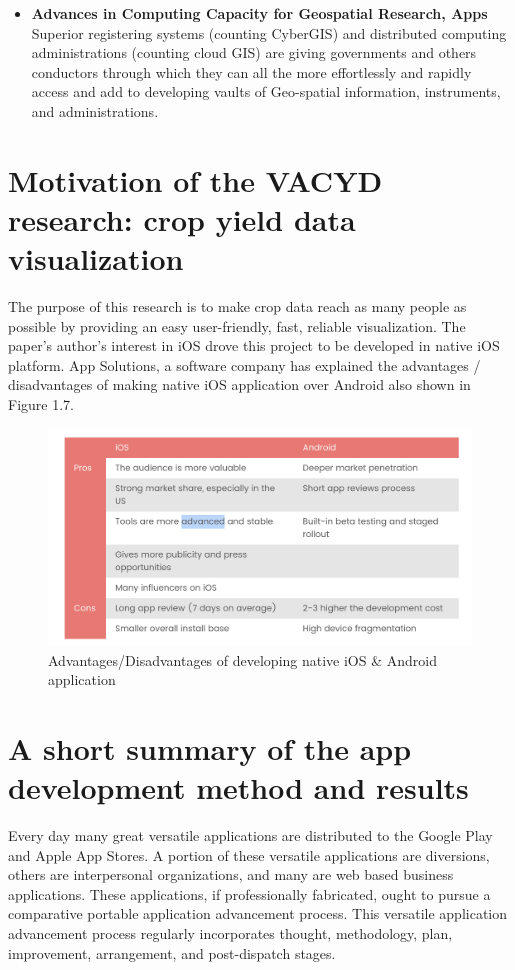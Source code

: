 \begin{itemize}
  \item  \textbf{Advances in Computing Capacity for Geospatial Research, Apps} \\
 Superior registering systems (counting CyberGIS) and distributed computing administrations (counting cloud GIS) are giving governments and others conductors through which they can all the more effortlessly and rapidly access and add to developing vaults of Geo-spatial information, instruments, and administrations.
  
\end{itemize}

\section{Motivation of the VACYD research: crop yield data visualization}

The purpose of this research is to make crop data reach as many people as possible by providing an easy user-friendly, fast, reliable visualization. The paper's author's interest in \gls{iOS} drove this project to be developed in native \gls{iOS} platform. App Solutions, a software company has explained the advantages / disadvantages of making native \gls{iOS} application over Android also shown in Figure 1.7\cite{theAPPsolutions}.

  \begin{figure}[H]
            \centering
            \includegraphics[width=0.8\linewidth]{figures/ch1/iosVSandroid.png}
            \caption{\label{fig:iosVSandroid} Advantages/Disadvantages of developing native iOS \& Android application \cite{theAPPsolutions}}
  \end{figure}


\section{A short summary of the app development method and results}

Every day many great versatile applications are distributed to the Google Play and Apple App Stores. A portion of these versatile applications are diversions, others are interpersonal organizations, and many are web based business applications. These applications, if professionally fabricated, ought to pursue a comparative portable application advancement process. This versatile application advancement process regularly incorporates thought, methodology, plan, improvement, arrangement, and post-dispatch stages.

